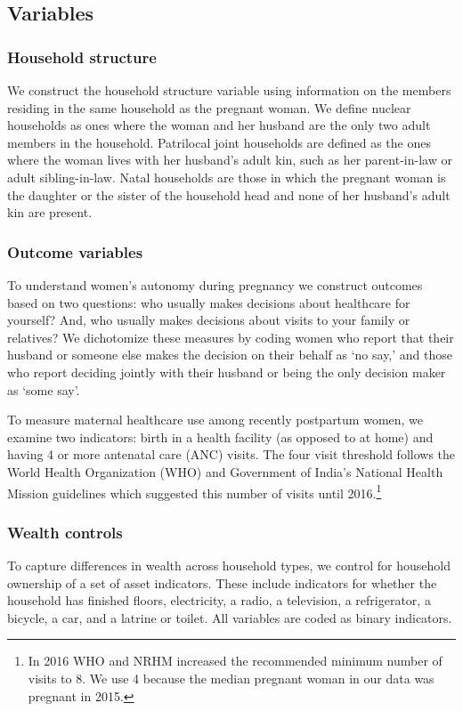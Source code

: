 \documentclass[12pt]{article}
\begin{document}
\subsection{Variables}

\subsubsection{Household structure}
We construct the household structure variable using information on the members residing in the same household as the pregnant woman. We define nuclear households as ones where the woman and her husband are the only two adult members in the household. Patrilocal joint households are defined as the ones where the woman lives with her husband’s adult kin, such as her parent-in-law or adult sibling-in-law. Natal households are those in which the pregnant woman is the daughter or the sister of the household head and none of her husband’s adult kin are present. 

\subsubsection{Outcome variables} \label{sec:outcomes}
To understand women's autonomy during pregnancy we construct outcomes based on two questions: who usually makes decisions about healthcare for yourself?  And, who usually makes decisions about visits to your family or relatives? We dichotomize these measures by coding women who report that their husband or someone else makes the decision on their behalf as ‘no say,’ and those who report deciding jointly with their husband or being the only decision maker as ‘some say’. 

To measure maternal healthcare use among recently postpartum women, we examine two indicators: birth in a health facility (as opposed to at home) and having 4 or more antenatal care (ANC) visits. The four visit threshold follows the World Health Organization (WHO) and Government of India’s National Health Mission guidelines which suggested this number of visits until 2016.\footnote{In 2016 WHO and NRHM increased the recommended minimum number of visits to 8.  We use 4 because the median pregnant woman in our data was pregnant in 2015.}

\subsubsection{Wealth controls}

To capture differences in wealth across household types, we control for household ownership of a set of asset indicators. These include indicators for whether the household has finished floors, electricity, a radio, a television, a refrigerator, a bicycle, a car, and a latrine or toilet. All variables are coded as binary indicators. 
\end{document}
